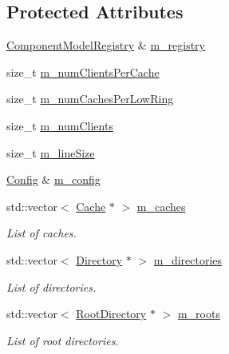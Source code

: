 \subsection*{Protected Attributes}
\begin{DoxyCompactItemize}
\item 
\hyperlink{class_component_model_registry}{Component\+Model\+Registry} \& \hyperlink{class_simulator_1_1_c_d_m_a_a19056757fe35a1c17146564ddb0afecf}{m\+\_\+registry}
\item 
size\+\_\+t \hyperlink{class_simulator_1_1_c_d_m_a_ad41683c11cec4d47c5ed8f5aa0c544c1}{m\+\_\+num\+Clients\+Per\+Cache}
\item 
size\+\_\+t \hyperlink{class_simulator_1_1_c_d_m_a_af6e3bb24fa6e0f5ee4e3d57233cc899b}{m\+\_\+num\+Caches\+Per\+Low\+Ring}
\item 
size\+\_\+t \hyperlink{class_simulator_1_1_c_d_m_a_acac9b9d9b18148e8d79020992cfdf541}{m\+\_\+num\+Clients}
\item 
size\+\_\+t \hyperlink{class_simulator_1_1_c_d_m_a_a7dab02d6c8bca4b895c81f224c8b96c3}{m\+\_\+line\+Size}
\item 
\hyperlink{class_config}{Config} \& \hyperlink{class_simulator_1_1_c_d_m_a_ae8160f56f781f1fc878578a011ef45df}{m\+\_\+config}
\item 
std\+::vector$<$ \hyperlink{class_simulator_1_1_c_d_m_a_1_1_cache}{Cache} $\ast$ $>$ \hyperlink{class_simulator_1_1_c_d_m_a_a82782c38b236bd4ce64db6498290970a}{m\+\_\+caches}
\begin{DoxyCompactList}\small\item\em List of caches. \end{DoxyCompactList}\item 
std\+::vector$<$ \hyperlink{class_simulator_1_1_c_d_m_a_1_1_directory}{Directory} $\ast$ $>$ \hyperlink{class_simulator_1_1_c_d_m_a_a2b6130ba000d98aff4ee59d07bf489a5}{m\+\_\+directories}
\begin{DoxyCompactList}\small\item\em List of directories. \end{DoxyCompactList}\item 
std\+::vector$<$ \hyperlink{class_simulator_1_1_c_d_m_a_1_1_root_directory}{Root\+Directory} $\ast$ $>$ \hyperlink{class_simulator_1_1_c_d_m_a_a71bfaa2e51ca8a4c5ffe6f75703c27d3}{m\+\_\+roots}
\begin{DoxyCompactList}\small\item\em List of root directories. \end{DoxyCompactList}\item 

\end{DoxyCompactItemize}
